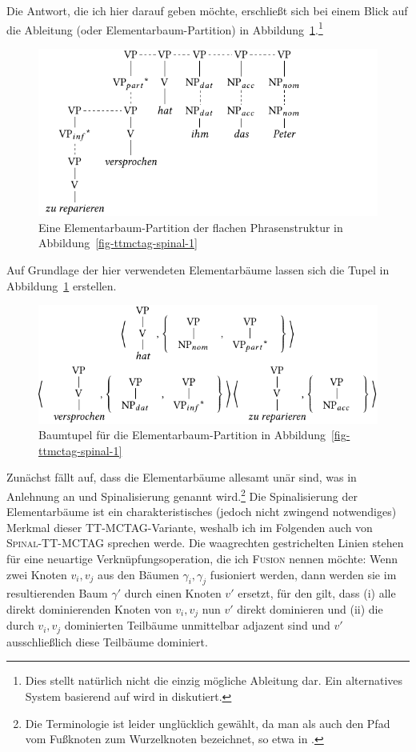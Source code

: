 Die Antwort, die ich hier darauf geben möchte, erschlie\ss t sich bei einem Blick auf die Ableitung (oder Elementarbaum-Partition) in Abbildung~\ref{fig-ttmctag-spinal-3}.\footnote{Dies stellt natürlich nicht die einzig mögliche Ableitung dar. Ein alternatives System basierend auf  wird in \cite{Lichte:10} diskutiert.} 
\begin{figure}[t]
\centering
\includegraphics{graphics/abb746.pdf}
\caption{\label{fig-ttmctag-spinal-3}Eine Elementarbaum-Partition der flachen Phrasenstruktur in Abbildung~\ref{fig-ttmctag-spinal-1}}
\end{figure}
Auf Grundlage der hier verwendeten Elementarbäume lassen sich die Tupel in Abbildung~\ref{fig-ttmctag-spinal-3} erstellen.  
\begin{figure}[h]
\centering
\includegraphics{graphics/abb747.pdf}
\caption{\label{fig-ttmctag-spinal-4}Baumtupel für die Elementarbaum-Partition in Abbildung~\ref{fig-ttmctag-spinal-1}}
\end{figure}
Zunächst fällt auf, dass die Elementarbäume allesamt unär sind, was in Anlehnung an \cite{Shen:06} und \cite{Shen:etal:08} Spinalisierung genannt wird.\footnote{Die Terminologie ist leider unglücklich gewählt, da man als  auch den Pfad vom Fu\ss knoten zum Wurzelknoten bezeichnet, so etwa in \cite{Schabes:Waters:95}.} Die Spinalisierung der Elementarbäume ist ein charakteristisches (jedoch nicht zwingend notwendiges) Merkmal dieser TT-MCTAG-Variante, weshalb ich im Folgenden auch von \textsc{Spinal-TT-MCTAG} sprechen werde. Die waagrechten gestrichelten Linien stehen für eine neuartige Verknüpfungsoperation, die ich \textsc{Fusion} nennen möchte: Wenn zwei Knoten $v_i,v_j$ aus den Bäumen $\gamma_i,\gamma_j$ fusioniert werden, dann werden sie im resultierenden Baum $\gamma'$ durch einen Knoten $v'$ ersetzt, für den gilt, dass (i) alle direkt dominierenden Knoten von $v_i, v_j$ nun $v'$ direkt dominieren und (ii) die durch $v_i,v_j$ dominierten Teilbäume unmittelbar adjazent sind und $v'$ ausschlie\ss lich diese Teilbäume dominiert.   
